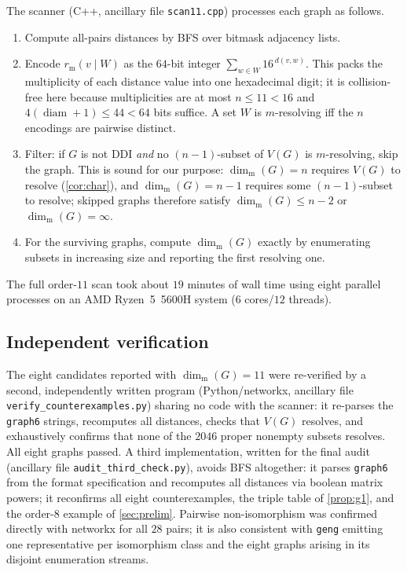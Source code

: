 \documentclass[11pt]{amsart}
\theoremstyle{remark}
\newcommand{\mdim}{\operatorname{dim}_{\mathrm m}}
\newcommand{\dist}{d}
\begin{document}
The scanner (C++, ancillary file \texttt{scan11.cpp}) processes each graph as follows.
\begin{enumerate}[leftmargin=2em]
\item Compute all-pairs distances by BFS over bitmask adjacency lists.
\item Encode $r_{\mathrm m}(v\mid W)$ as the $64$-bit integer $\sum_{w\in W} 16^{\,\dist(v,w)}$.  This packs the multiplicity of each distance value into one hexadecimal digit; it is collision-free here because multiplicities are at most $n\le 11<16$ and $4(\operatorname{diam}+1)\le 44<64$ bits suffice.  A set $W$ is $m$-resolving iff the $n$ encodings are pairwise distinct.
\item Filter: if $G$ is not DDI \emph{and} no $(n-1)$-subset of $V(G)$ is $m$-resolving, skip the graph.  This is sound for our purpose: $\mdim(G)=n$ requires $V(G)$ to resolve (\cref{cor:char}), and $\mdim(G)=n-1$ requires some $(n-1)$-subset to resolve; skipped graphs therefore satisfy $\mdim(G)\le n-2$ or $\mdim(G)=\infty$.
\item For the surviving graphs, compute $\mdim(G)$ exactly by enumerating subsets in increasing size and reporting the first resolving one.
\end{enumerate}
The full order-$11$ scan took about $19$ minutes of wall time using eight parallel processes on an AMD Ryzen~5~5600H system ($6$ cores/$12$ threads).

\subsection{Independent verification}
The eight candidates reported with $\mdim(G)=11$ were re-verified by a second, independently written program (\textsf{Python}/\textsf{networkx}, ancillary file \texttt{verify\_counterexamples.py}) sharing no code with the scanner: it re-parses the \texttt{graph6} strings, recomputes all distances, checks that $V(G)$ resolves, and exhaustively confirms that none of the $2046$ proper nonempty subsets resolves.  All eight graphs passed.  A third implementation, written for the final audit (ancillary file \texttt{audit\_third\_check.py}), avoids BFS altogether: it parses \texttt{graph6} from the format specification and recomputes all distances via boolean matrix powers; it reconfirms all eight counterexamples, the triple table of \cref{prop:g1}, and the order-$8$ example of \cref{sec:prelim}.  Pairwise non-isomorphism was confirmed directly with \textsf{networkx} for all $28$ pairs; it is also consistent with \texttt{geng} emitting one representative per isomorphism class and the eight graphs arising in its disjoint enumeration streams.
\end{document}
